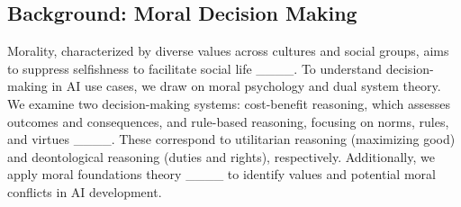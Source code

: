 \subsection{Background: Moral Decision Making}
\label{ssec:moral-decision-making}
Morality, characterized by diverse values across cultures and social groups, aims to suppress selfishness to facilitate social life ____. To understand decision-making in AI use cases, we draw on moral psychology and dual system theory. We examine two decision-making systems: cost-benefit reasoning, which assesses outcomes and consequences, and rule-based reasoning, focusing on norms, rules, and virtues ____. These correspond to utilitarian reasoning (maximizing good) and deontological reasoning (duties and rights), respectively. Additionally, we apply moral foundations theory ____ to identify values and potential moral conflicts in AI development.


